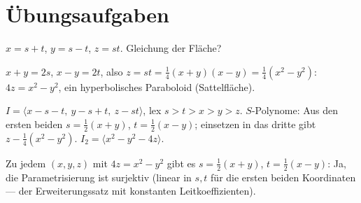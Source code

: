 \section{Übungsaufgaben}

\begin{aufgabe}
$x = s + t$, $y = s - t$, $z = st$. Gleichung der Fläche?

\loesung
{}
$x + y = 2s$, $x - y = 2t$, also $z = st = \tfrac14(x + y)(x - y) = \tfrac14(x^{2} - y^{2})$: $4z = x^{2} - y^{2}$, ein hyperbolisches Paraboloid (Sattelfläche).

$I = \langle x - s - t,\ y - s + t,\ z - st\rangle$, lex $s > t > x > y > z$. $S$-Polynome: Aus den ersten beiden $s = \tfrac12(x + y)$, $t = \tfrac12(x - y)$; einsetzen in das dritte gibt $z - \tfrac14(x^{2} - y^{2})$. $I_2 = \langle x^{2} - y^{2} - 4z\rangle$. \checkmark

Zu jedem $(x, y, z)$ mit $4z = x^{2} - y^{2}$ gibt es $s = \tfrac12(x + y)$, $t = \tfrac12(x - y)$: Ja, die Parametrisierung ist surjektiv (linear in $s, t$ für die ersten beiden Koordinaten --- der Erweiterungssatz mit konstanten Leitkoeffizienten).

\begin{center}
\begin{minipage}{0.88\textwidth}
\end{minipage}
\end{center}
\end{aufgabe}

